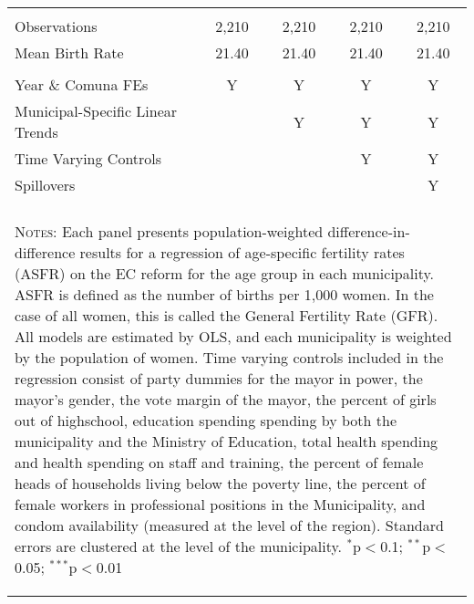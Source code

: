 \begin{table}[!htbp]
\begin{tabular}{@{\extracolsep{5pt}}lcccc}
 & & & & \\
Observations&2,210&2,210&2,210&2,210\\
Mean Birth Rate&21.40&21.40&21.40&21.40\\
\hline \\[-1.8ex] 
{\small Year \& Comuna FEs}             &Y&Y&Y&Y \\
{\small Municipal-Specific Linear Trends}& &Y&Y&Y \\
{\small Time Varying Controls}           & & &Y&Y \\
{\small Spillovers}                      & & & &Y \\
\hline \hline \\[-1.8ex]
\multicolumn{5}{p{12.8cm}}{\begin{footnotesize}
\textsc{Notes:} Each panel presents population-weighted
 difference-in-difference results for a regression of 
age-specific fertility rates (ASFR) on the EC reform for
 the age group in
 each municipality.  ASFR is defined as the number of   
births per 1,000 women.  In the case of all women, this 
is called the General Fertility Rate (GFR). All models  
are estimated by OLS, and each municipality is          
weighted by the population of women. Time varying       
controls included in the regression consist of party    
dummies for the mayor in power, the mayor's gender, the
 vote margin of the mayor, the percent of girls out of  
highschool, education spending spending by both the     
municipality and the Ministry of Education, total       
health spending and health spending on staff and        
training, the percent of female heads of households     
living below the poverty line, the percent of female    
workers in professional positions in the Municipality,  
and condom availability (measured at the level of the   
region). Standard errors are clustered at the level of  
the municipality.
$^{*}$p$<$0.1; $^{**}$p$<$0.05; $^{***}$p$<$0.01\end{footnotesize}}
\normalsize\end{tabular}\end{table}
